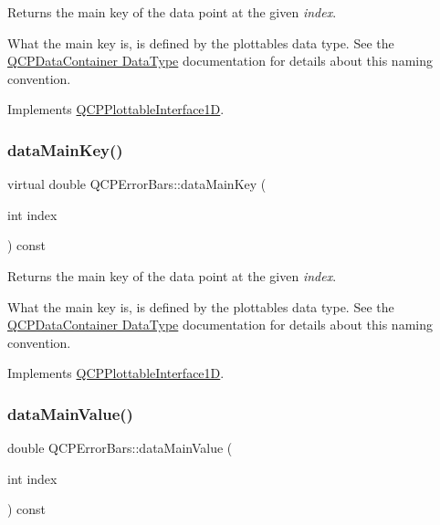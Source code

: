 Returns the main key of the data point at the given {\itshape index}.

What the main key is, is defined by the plottable\textquotesingle{}s data type. See the \hyperlink{class_q_c_p_data_container_qcpdatacontainer-datatype}{Q\+C\+P\+Data\+Container Data\+Type} documentation for details about this naming convention. 

Implements \hyperlink{class_q_c_p_plottable_interface1_d_a2bd60daaac046945fead558cbd83cf73}{Q\+C\+P\+Plottable\+Interface1D}.

\mbox{\label{class_q_c_p_error_bars_acdd5689cdb5562706111a55381fb9009}} 
\subsubsection{\texorpdfstring{data\+Main\+Key()}{dataMainKey()}\hspace{0.1cm}{\footnotesize\ttfamily [2/2]}}
{\footnotesize\ttfamily virtual double Q\+C\+P\+Error\+Bars\+::data\+Main\+Key (\begin{DoxyParamCaption}\item[{int}]{index }\end{DoxyParamCaption}) const\hspace{0.3cm}{\ttfamily [virtual]}}

Returns the main key of the data point at the given {\itshape index}.

What the main key is, is defined by the plottable\textquotesingle{}s data type. See the \hyperlink{class_q_c_p_data_container_qcpdatacontainer-datatype}{Q\+C\+P\+Data\+Container Data\+Type} documentation for details about this naming convention. 

Implements \hyperlink{class_q_c_p_plottable_interface1_d_a2bd60daaac046945fead558cbd83cf73}{Q\+C\+P\+Plottable\+Interface1D}.

\mbox{\label{class_q_c_p_error_bars_a88cd90280366b44c2159774bfb7c473a}} 
\subsubsection{\texorpdfstring{data\+Main\+Value()}{dataMainValue()}\hspace{0.1cm}{\footnotesize\ttfamily [1/2]}}
{\footnotesize\ttfamily double Q\+C\+P\+Error\+Bars\+::data\+Main\+Value (\begin{DoxyParamCaption}\item[{int}]{index }\end{DoxyParamCaption}) const\hspace{0.3cm}{\ttfamily [virtual]}}

